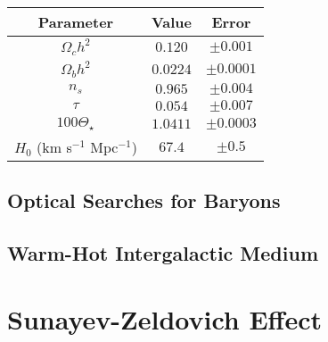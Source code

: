 \begin{center}\label{table:params}
 \begin{tabular}{||c c c||} 
 \hline
 Parameter & Value & Error \\
 \hline\hline
 $\Omega_c h^2$ & $0.120$ & $\pm 0.001$ \\
 \hline
 $\Omega_b h^2$ & $0.0224$ & $\pm 0.0001$ \\
 \hline
  $n_s$ & $0.965$ & $\pm 0.004$ \\
 \hline
  $\tau$  & $0.054$ & $\pm 0.007$ \\
 \hline
  $100 \Theta_\star$ & $1.0411$ & $\pm 0.0003$ \\
 \hline
 $H_0$ (km s$^{-1}$ Mpc$^{-1}$) & $67.4$ & $\pm 0.5$ \\
 \hline
\end{tabular}
\end{center}

\subsection{Optical Searches for Baryons}

\subsection{Warm-Hot Intergalactic Medium}


\section{Sunayev-Zeldovich Effect}


